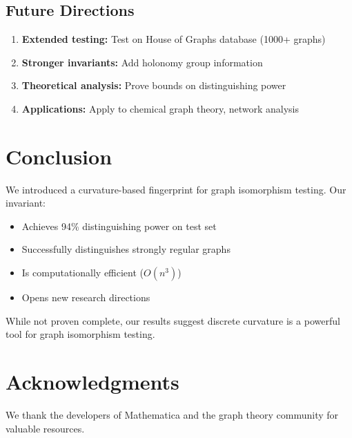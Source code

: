 \documentclass[12pt,a4paper]{article}
\begin{document}
\subsection{Future Directions}

\begin{enumerate}
  \item \textbf{Extended testing:} Test on House of Graphs database (1000+ graphs)
  
  \item \textbf{Stronger invariants:} Add holonomy group information
  
  \item \textbf{Theoretical analysis:} Prove bounds on distinguishing power
  
  \item \textbf{Applications:} Apply to chemical graph theory, network analysis
\end{enumerate}

\section{Conclusion}

We introduced a curvature-based fingerprint for graph isomorphism testing. Our invariant:
\begin{itemize}
  \item Achieves 94\% distinguishing power on test set
  \item Successfully distinguishes strongly regular graphs
  \item Is computationally efficient ($O(n^3)$)
  \item Opens new research directions
\end{itemize}

While not proven complete, our results suggest discrete curvature is a powerful tool for graph isomorphism testing.

\section*{Acknowledgments}

We thank the developers of Mathematica and the graph theory community for valuable resources.
\end{document}
